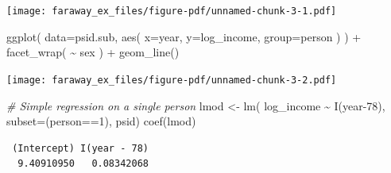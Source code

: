 \documentclass[
  letterpaper,
  DIV=11,
  numbers=noendperiod]{scrreprt}
\newenvironment{Shaded}{}{}
\newcommand{\AttributeTok}[1]{\textcolor[rgb]{0.49,0.56,0.16}{#1}}
\newcommand{\CommentTok}[1]{\textcolor[rgb]{0.38,0.63,0.69}{\textit{#1}}}
\newcommand{\ControlFlowTok}[1]{\textcolor[rgb]{0.00,0.44,0.13}{\textbf{#1}}}
\newcommand{\DecValTok}[1]{\textcolor[rgb]{0.25,0.63,0.44}{#1}}
\newcommand{\FunctionTok}[1]{\textcolor[rgb]{0.02,0.16,0.49}{#1}}
\newcommand{\NormalTok}[1]{#1}
\newcommand{\OtherTok}[1]{\textcolor[rgb]{0.00,0.44,0.13}{#1}}
\newcommand{\SpecialCharTok}[1]{\textcolor[rgb]{0.25,0.44,0.63}{#1}}
\newcommand{\StringTok}[1]{\textcolor[rgb]{0.25,0.44,0.63}{#1}}
\begin{document}
\texttt{[image: faraway\_ex\_files/figure-pdf/unnamed-chunk-3-1.pdf]}

\begin{Shaded}
\begin{Highlighting}[]
\FunctionTok{ggplot}\NormalTok{( }\AttributeTok{data=}\NormalTok{psid.sub, }\FunctionTok{aes}\NormalTok{( }\AttributeTok{x=}\NormalTok{year, }\AttributeTok{y=}\NormalTok{log\_income, }\AttributeTok{group=}\NormalTok{person ) ) }\SpecialCharTok{+}
    \FunctionTok{facet\_wrap}\NormalTok{( }\SpecialCharTok{\textasciitilde{}}\NormalTok{ sex ) }\SpecialCharTok{+}
    \FunctionTok{geom\_line}\NormalTok{()}
\end{Highlighting}
\end{Shaded}

\texttt{[image: faraway\_ex\_files/figure-pdf/unnamed-chunk-3-2.pdf]}

\begin{Shaded}
\begin{Highlighting}[]
\CommentTok{\# Simple regression on a single person}
\NormalTok{lmod }\OtherTok{\textless{}{-}} \FunctionTok{lm}\NormalTok{( log\_income }\SpecialCharTok{\textasciitilde{}} \FunctionTok{I}\NormalTok{(year}\DecValTok{{-}78}\NormalTok{), }\AttributeTok{subset=}\NormalTok{(person}\SpecialCharTok{==}\DecValTok{1}\NormalTok{), psid)}
\FunctionTok{coef}\NormalTok{(lmod)}
\end{Highlighting}
\end{Shaded}

\begin{verbatim}
 (Intercept) I(year - 78) 
  9.40910950   0.08342068 
\end{verbatim}

\begin{Shaded}
\end{Shaded}
\end{document}
